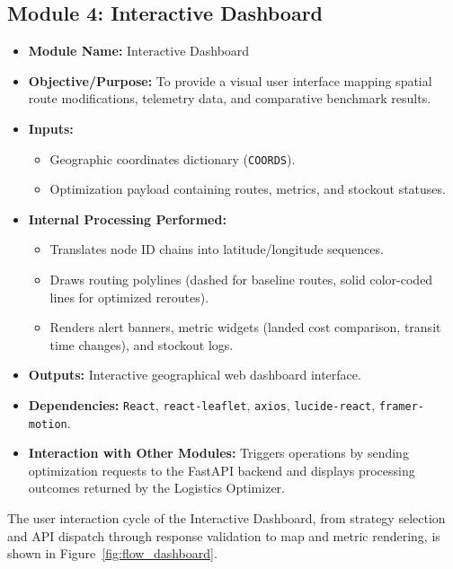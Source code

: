 \subsection[Module 4: Interactive Dashboard]{Module 4: Interactive Dashboard}
\begin{itemize}
    \item \textbf{Module Name:} Interactive Dashboard
    \item \textbf{Objective/Purpose:} To provide a visual user interface mapping spatial route modifications, telemetry data, and comparative benchmark results.
    \item \textbf{Inputs:}
    \begin{itemize}
        \item Geographic coordinates dictionary (\texttt{COORDS}).
        \item Optimization payload containing routes, metrics, and stockout statuses.
    \end{itemize}
    \item \textbf{Internal Processing Performed:}
    \begin{itemize}
        \item Translates node ID chains into latitude/longitude sequences.
        \item Draws routing polylines (dashed for baseline routes, solid color-coded lines for optimized reroutes).
        \item Renders alert banners, metric widgets (landed cost comparison, transit time changes), and stockout logs.
    \end{itemize}
    \item \textbf{Outputs:} Interactive geographical web dashboard interface.
    \item \textbf{Dependencies:} \texttt{React}, \texttt{react-leaflet}, \texttt{axios}, \texttt{lucide-react}, \texttt{framer-motion}.
    \item \textbf{Interaction with Other Modules:} Triggers operations by sending optimization requests to the FastAPI backend and displays processing outcomes returned by the Logistics Optimizer.
\end{itemize}
The user interaction cycle of the Interactive Dashboard, from strategy selection and API dispatch through response validation to map and metric rendering, is shown in Figure~\ref{fig:flow_dashboard}.

